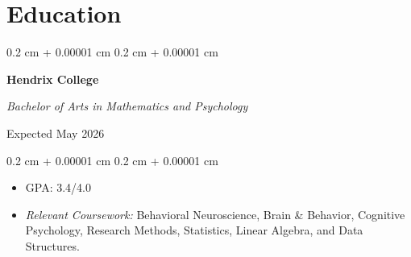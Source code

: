 \documentclass[10pt, letterpaper]{article}
\newenvironment{highlights}{
    \begin{itemize}[
        topsep=0.10 cm,
        parsep=0.10 cm,
        partopsep=0pt,
        itemsep=0pt,
        leftmargin=0.4 cm + 10pt
    ]
}{
    \end{itemize}
} %
\newenvironment{highlightsforbulletentries}{
    \begin{itemize}[
        topsep=0.10 cm,
        parsep=0.10 cm,
        partopsep=0pt,
        itemsep=0pt,
        leftmargin=10pt
    ]
}{
    \end{itemize}
} %
\newenvironment{onecolentry}{
    \begin{adjustwidth}{
        0.2 cm + 0.00001 cm
    }{
        0.2 cm + 0.00001 cm
    }
}{
    \end{adjustwidth}
} %
\newenvironment{twocolentry}[2][]{
    \onecolentry
    \def\secondColumn{#2}
    \setcolumnwidth{\fill, 4.5 cm}
    \begin{paracol}{2}
}{
    \switchcolumn \raggedleft \secondColumn
    \end{paracol}
    \endonecolentry
} %
\let\hrefWithoutArrow\href
\renewcommand{\href}[2]{\hrefWithoutArrow{#1}{\ifthenelse{\equal{#2}{}}{ }{#2 }\raisebox{.15ex}{\footnotesize \faExternalLink*}}}
\begin{document}













\section{Education}

\begin{twocolentry}
    {
        Expected May 2026
    }
    \textbf{Hendrix College}

    \textit{Bachelor of Arts in Mathematics and Psychology}
\end{twocolentry}

\vspace{0.10 cm}

\begin{onecolentry}
    \begin{highlights}
        \item GPA: 3.4/4.0
        \item \textit{Relevant Coursework:} Behavioral Neuroscience, Brain \& Behavior, Cognitive Psychology, Research Methods, Statistics, Linear Algebra, and Data Structures.
    \end{highlights}
\end{onecolentry}
\end{document}
